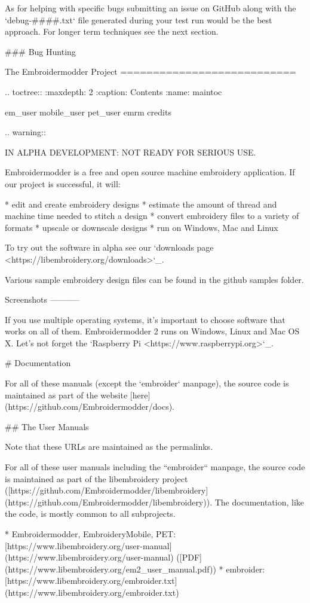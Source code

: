 As for helping with specific bugs submitting an issue on GitHub along with the `debug-####.txt` file generated during
your test run would be the best approach. For longer term techniques see the next section.

### Bug Hunting

The Embroidermodder Project
===========================

.. toctree::
   :maxdepth: 2
   :caption: Contents
   :name: maintoc

   em_user
   mobile_user
   pet_user
   emrm
   credits

.. warning::

   IN ALPHA DEVELOPMENT: NOT READY FOR SERIOUS USE.

Embroidermodder is a free and open source machine embroidery application.
If our project is successful, it will:

  * edit and create embroidery designs
  * estimate the amount of thread and machine time needed to stitch a design
  * convert embroidery files to a variety of formats
  * upscale or downscale designs
  * run on Windows, Mac and Linux

To try out the software in alpha see our `downloads page <https://libembroidery.org/downloads>`_.

Various sample embroidery design files can be found in
the github samples folder.

Screenshots
-----------

If you use multiple operating systems, it's important to choose
software that works on all of them. Embroidermodder 2 runs on Windows,
Linux and Mac OS X. Let's not forget the `Raspberry Pi <https://www.raspberrypi.org>`_.

# Documentation

For all of these manuals (except the `embroider` manpage),
the source code is maintained as part
of the website [here](https://github.com/Embroidermodder/docs).

## The User Manuals

Note that these URLs are maintained as the permalinks.

For all of these user manuals including the ``embroider`` manpage,
the source code is maintained as part
of the libembroidery project ([https://github.com/Embroidermodder/libembroidery](https://github.com/Embroidermodder/libembroidery)).
The documentation, like the code, is mostly common to all subprojects.

* Embroidermodder, EmbroideryMobile, PET: [https://www.libembroidery.org/user-manual](https://www.libembroidery.org/user-manual) ([PDF](https://www.libembroidery.org/em2_user_manual.pdf))
* embroider: [https://www.libembroidery.org/embroider.txt](https://www.libembroidery.org/embroider.txt)

